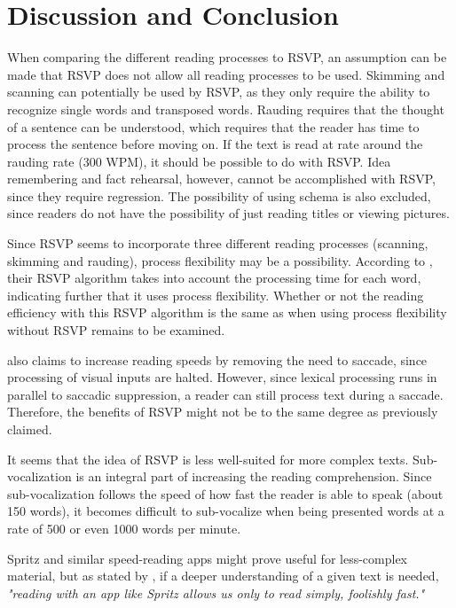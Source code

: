 \section{\fontsize{12}{15}\selectfont Discussion and Conclusion}
When comparing the different reading processes to RSVP, an assumption can be made that RSVP does not allow all reading processes to be used. Skimming and scanning can potentially be used by RSVP, as they only require the ability to recognize single words and transposed words. Rauding requires that the thought of a sentence can be understood, which requires that the reader has time to process the sentence before moving on. If the text is read at rate around the rauding rate (300 WPM), it should be possible to do with RSVP. Idea remembering and fact rehearsal, however, cannot be accomplished with RSVP, since they require regression. The possibility of using schema is also excluded, since readers do not have the possibility of just reading titles or viewing pictures.

Since RSVP seems to incorporate three different reading processes (scanning, skimming and rauding), process flexibility may be a possibility. According to , their RSVP algorithm takes into account the processing time for each word, indicating further that it uses process flexibility. Whether or not the reading efficiency with this RSVP algorithm is the same as when using process flexibility without RSVP remains to be examined.

 also claims to increase reading speeds by removing the need to saccade, since processing of visual inputs are halted. However, since lexical processing runs in parallel 
to saccadic suppression, a reader can still process text during a saccade. Therefore, the benefits of RSVP might not be to the same degree as previously claimed.

It seems that the idea of RSVP is less well-suited for more complex texts. Sub-vocalization is an integral part of increasing the reading comprehension. Since sub-vocalization follows the speed of how fast the reader is able to speak (about 150 words), it becomes difficult to sub-vocalize when being presented words at a rate of 500 or even 1000 words per minute. 

Spritz and similar speed-reading apps might prove useful for less-complex material, but as stated by , if a deeper understanding of a given text is needed, \emph{"reading with an app like Spritz allows us only to read simply, foolishly fast."}

